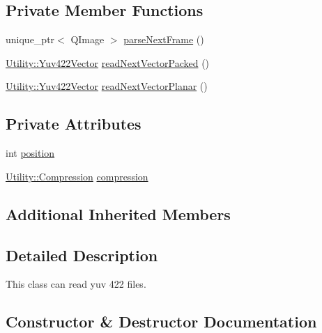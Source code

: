 \subsection*{Private Member Functions}
\begin{DoxyCompactItemize}
\item 
unique\+\_\+ptr$<$ Q\+Image $>$ \hyperlink{classUtility_1_1Yuv422FileReader_a22ed1cd234a6f19e4108129f99faa4ad}{parse\+Next\+Frame} ()
\item 
\hyperlink{classUtility_1_1Yuv422Vector}{Utility\+::\+Yuv422\+Vector} \hyperlink{classUtility_1_1Yuv422FileReader_addf2f9765d3e5bebf28f97963e8ddfc8}{read\+Next\+Vector\+Packed} ()
\item 
\hyperlink{classUtility_1_1Yuv422Vector}{Utility\+::\+Yuv422\+Vector} \hyperlink{classUtility_1_1Yuv422FileReader_a72c5e3f4e4763812239845f0add38ac6}{read\+Next\+Vector\+Planar} ()
\end{DoxyCompactItemize}
\subsection*{Private Attributes}
\begin{DoxyCompactItemize}
\item 
int \hyperlink{classUtility_1_1Yuv422FileReader_a401e942526aac47cef94f478182486e7}{position}
\item 
\hyperlink{namespaceUtility_a56a83bf6847f4801f4205eb4be237ccf}{Utility\+::\+Compression} \hyperlink{classUtility_1_1Yuv422FileReader_aa484ffcb0c9f4d4dea91c6fae73f1fda}{compression}
\end{DoxyCompactItemize}
\subsection*{Additional Inherited Members}


\subsection{Detailed Description}
This class can read yuv 422 files. 

\subsection{Constructor \& Destructor Documentation}
\hypertarget{classUtility_1_1Yuv422FileReader_a061cfaea6974d3d0ff811c44bf036edd}{}

